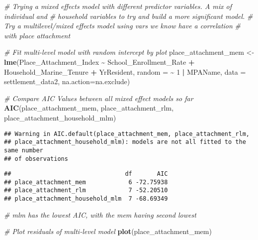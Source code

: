 \documentclass[
]{article}
\newenvironment{Shaded}{\begin{snugshade}}{\end{snugshade}}
\newcommand{\AttributeTok}[1]{\textcolor[rgb]{0.13,0.29,0.53}{#1}}
\newcommand{\CommentTok}[1]{\textcolor[rgb]{0.56,0.35,0.01}{\textit{#1}}}
\newcommand{\DecValTok}[1]{\textcolor[rgb]{0.00,0.00,0.81}{#1}}
\newcommand{\FunctionTok}[1]{\textcolor[rgb]{0.13,0.29,0.53}{\textbf{#1}}}
\newcommand{\NormalTok}[1]{#1}
\newcommand{\OtherTok}[1]{\textcolor[rgb]{0.56,0.35,0.01}{#1}}
\newcommand{\SpecialCharTok}[1]{\textcolor[rgb]{0.81,0.36,0.00}{\textbf{#1}}}
\begin{document}
\begin{Shaded}
\begin{Highlighting}[]
\CommentTok{\# Trying a mixed effects model with different predictor variables. A mix of individual and }
\CommentTok{\# household variables to try and build a more significant model. }
\CommentTok{\# Try a multilevel/mixed effects model using vars we know have a correlation}
\CommentTok{\# with place attachment }

\CommentTok{\# Fit multi{-}level model with random intercept by plot}
\NormalTok{place\_attachment\_mem }\OtherTok{\textless{}{-}} \FunctionTok{lme}\NormalTok{(Place\_Attachment\_Index }\SpecialCharTok{\textasciitilde{}} 
\NormalTok{                            School\_Enrollment\_Rate }\SpecialCharTok{+}
\NormalTok{                              Household\_Marine\_Tenure }\SpecialCharTok{+}
\NormalTok{                              YrResident, }
                            \AttributeTok{random =} \SpecialCharTok{\textasciitilde{}} \DecValTok{1} \SpecialCharTok{|}\NormalTok{ MPAName, }\AttributeTok{data =}\NormalTok{ settlement\_data2, }
                            \AttributeTok{na.action=}\NormalTok{na.exclude)}

\CommentTok{\# Compare AIC Values between all mixed effect models so far}
\FunctionTok{AIC}\NormalTok{(place\_attachment\_mem, place\_attachment\_rlm, place\_attachment\_household\_mlm)}
\end{Highlighting}
\end{Shaded}

\begin{verbatim}
## Warning in AIC.default(place_attachment_mem, place_attachment_rlm,
## place_attachment_household_mlm): models are not all fitted to the same number
## of observations
\end{verbatim}

\begin{verbatim}
##                                df       AIC
## place_attachment_mem            6 -72.75938
## place_attachment_rlm            7 -52.20510
## place_attachment_household_mlm  7 -68.69349
\end{verbatim}

\begin{Shaded}
\begin{Highlighting}[]
\CommentTok{\# mlm has the lowest AIC, with the mem having second lowest}

\CommentTok{\# Plot residuals of multi{-}level model}
\FunctionTok{plot}\NormalTok{(place\_attachment\_mem)}
\end{Highlighting}
\end{Shaded}
\end{document}

